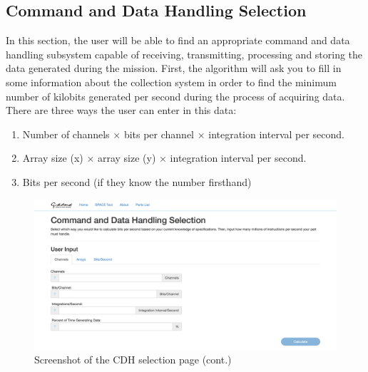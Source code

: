 \documentclass[a4, 12 pt]{article} %
\begin{document}
\subsection{Command and Data Handling Selection}
In this section, the user will be able to find an appropriate command and data handling subsystem capable of receiving, transmitting, processing and storing the data generated during the mission. First, the algorithm will ask you to fill in some information about the collection system in order to find the minimum number of kilobits generated per second during the process of acquiring data. There are three ways the user can enter in this data:
\begin{enumerate}
\item Number of channels $\times$ bits per channel $\times$ integration interval per second. 
\item Array size (x) $\times$ array size (y) $\times$ integration interval per second.
\item Bits per second (if they know the number firsthand)
\end{enumerate}
\begin{figure}[H]
\begin{center}
\includegraphics[width=\linewidth]{6a}
\caption{Screenshot of the CDH selection page (cont.)}
\label{default}
\end{center}
\end{figure}
\end{document}
